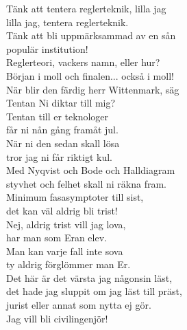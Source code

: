 \documentclass[a6paper, 10pt, twoside]{article}
\begin{document}
\noindent
\begin{center}
\end{center}
\begin{lyrics}
Tänk att tentera reglerteknik, lilla jag \\
lilla jag, tentera reglerteknik. \\
Tänk att bli uppmärksammad av en sån \\
populär institution!
\vspace{5pt} \\
Reglerteori, vackers namn, eller hur? \\
Början i moll och finalen... också i moll! \\
När blir den färdig herr Wittenmark, säg \\
Tentan Ni diktar till mig?
\vspace{5pt} \\
Tentan till er teknologer \\
får ni nån gång framåt jul. \\
När ni den sedan skall lösa\\
tror jag ni får riktigt kul. \\
Med Nyqvist och Bode och Halldiagram \\
styvhet och felhet skall ni räkna fram.\\
Minimum fasasymptoter till sist, \\
det kan väl aldrig bli trist!
\vspace{5pt} \\
Nej, aldrig trist vill jag lova, \\
har man som Eran elev. \\
Man kan varje fall inte sova \\
ty aldrig förglömmer man Er. \\
Det här är det värsta jag någonsin läst, \\
det hade jag sluppit om jag läst till präst, \\
jurist eller annat som nytta ej gör. \\
Jag vill bli civilingenjör!
\end{lyrics}
\end{document}
